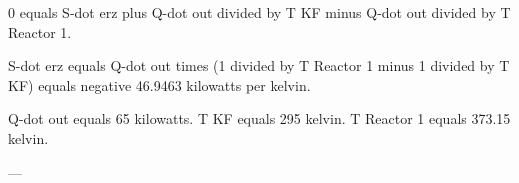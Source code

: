 0 equals S-dot erz plus Q-dot out divided by T KF minus Q-dot out divided by T Reactor 1.  

S-dot erz equals Q-dot out times (1 divided by T Reactor 1 minus 1 divided by T KF) equals negative 46.9463 kilowatts per kelvin.  

Q-dot out equals 65 kilowatts.  
T KF equals 295 kelvin.  
T Reactor 1 equals 373.15 kelvin.  

---